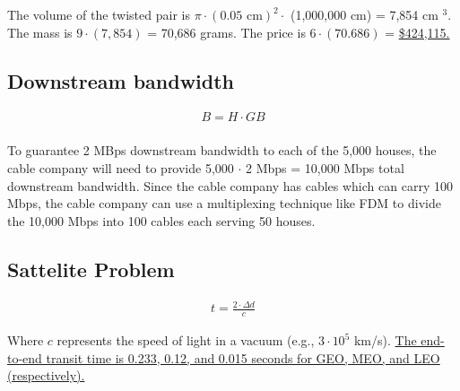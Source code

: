 The volume of the twisted pair is $\pi \cdot (0.05 \text{ cm})^2 \cdot $ (1,000,000 cm) = 7,854 cm $^3$. The mass is $9 \cdot (7,854)$ = 70,686 grams. The price is $6 \cdot (70.686)$ = \ul{\$424,115.}


\subsection{Downstream bandwidth}
\begin{align*}
	B = H \cdot GB \\
\end{align*}

To guarantee 2 MBps downstream bandwidth to each of the 5,000 houses, the cable company will need to provide 5,000 $\cdot$ 2 Mbps = 10,000 Mbps total downstream bandwidth. Since the cable company has cables which can carry 100 Mbps, the cable company can use a multiplexing technique like FDM to divide the 10,000 Mbps into 100 cables each serving 50 houses.

\subsection{Sattelite Problem}
\begin{align*}
	t = \frac{2 \cdot \Delta d}{c}
\end{align*}

Where $c$ represents the speed of light in a vacuum (e.g., $3 \cdot 10^5$ km/s). \ul{The end-to-end transit time is 0.233, 0.12, and 0.015 seconds for GEO, MEO, and LEO (respectively).}




